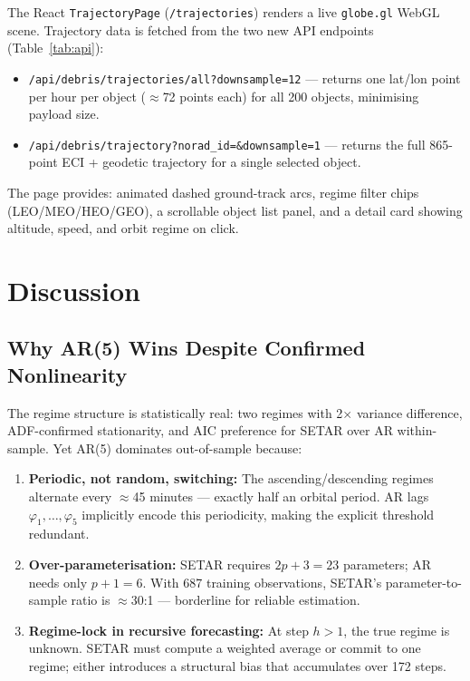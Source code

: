 \documentclass[conference]{IEEEtran}
\begin{document}
The React \texttt{TrajectoryPage} (\texttt{/trajectories}) renders a live
\texttt{globe.gl} WebGL scene. Trajectory data is fetched from the two new
API endpoints (Table~\ref{tab:api}):

\begin{itemize}
  \item \texttt{/api/debris/trajectories/all?downsample=12} --- returns
        one lat/lon point per hour per object ($\approx$72 points each)
        for all 200 objects, minimising payload size.
  \item \texttt{/api/debris/trajectory?norad\_id=\&downsample=1} --- returns
        the full 865-point ECI + geodetic trajectory for a single selected
        object.
\end{itemize}

The page provides: animated dashed ground-track arcs, regime filter chips
(LEO/MEO/HEO/GEO), a scrollable object list panel, and a detail card
showing altitude, speed, and orbit regime on click.

\section{Discussion}
\label{sec:discussion}

\subsection{Why AR(5) Wins Despite Confirmed Nonlinearity}

The regime structure is statistically real: two regimes with 2$\times$
variance difference, ADF-confirmed stationarity, and AIC preference for
SETAR over AR within-sample. Yet AR(5) dominates out-of-sample because:

\begin{enumerate}
  \item \textbf{Periodic, not random, switching:} The ascending/descending
        regimes alternate every $\approx$45 minutes — exactly half an orbital
        period. AR lags $\varphi_1, \ldots, \varphi_5$ implicitly encode this
        periodicity, making the explicit threshold redundant.
  \item \textbf{Over-parameterisation:} SETAR requires $2p + 3 = 23$ parameters;
        AR needs only $p + 1 = 6$. With 687 training observations, SETAR's
        parameter-to-sample ratio is $\approx$30:1 --- borderline for reliable
        estimation.
  \item \textbf{Regime-lock in recursive forecasting:} At step $h > 1$,
        the true regime is unknown. SETAR must compute a weighted average or
        commit to one regime; either introduces a structural bias that
        accumulates over 172 steps.
\end{enumerate}
\end{document}
